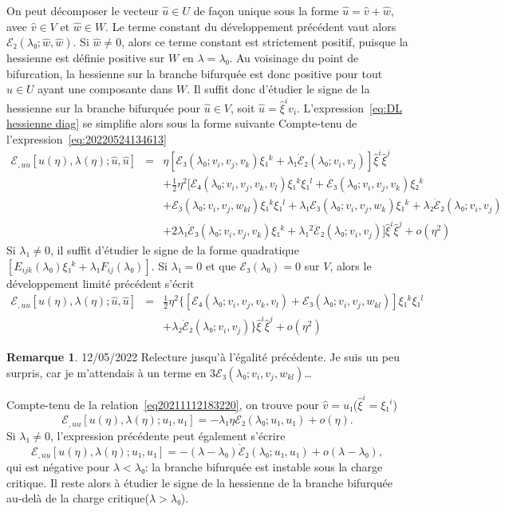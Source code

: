 \documentclass[12pt, final]{amsart}
\theoremstyle{definition}
\newtheorem{remark}{Remarque}
\begin{document}
On peut décomposer le vecteur \(\hat{u}∈U\) de fa{\c c}on unique sous la forme \(\hat{u} = \hat{v} + \hat{w}\), avec \(\hat{v}∈V\) et \(\hat{w}∈W\). Le terme constant du développement précédent vaut alors \(ℰ₂(λ₀ ; \hat{w}, \hat{w})\). Si \(\hat{w} \neq 0\), alors ce terme constant est strictement positif, puisque la hessienne est définie positive sur \(W\) en \(λ = λ₀\). Au voisinage du point de bifurcation, la hessienne sur la branche bifurquée est donc positive pour tout \(\hat{u}∈U\) ayant une composante dans \(W\). Il suffit donc d'étudier le signe de la hessienne sur la branche bifurquée pour \(\hat{u}∈V\), soit \(\hat{u} = \hat{ξ}^i v_i\). L'expression~\eqref{eq:DL hessienne diag} se simplifie alors sous la forme suivante Compte-tenu de l'expression~\eqref{eq:20220524134613}
\begin{eqnarray}
 ℰ_{, u u} [u(η), λ(η) ; \hat{u}, \hat{u}] &
 = & η [ℰ₃(λ₀ ; v_i, v_j, v_k) ξ₁^k + λ₁
 \dot{ℰ}₂(λ₀ ; v_i, v_j)] \hat{ξ}^i \hat{ξ}^j
 \nonumber\\
 & & + \tfrac{1}{2} η^2 [ℰ₄(λ₀ ; v_i, v_j, v_k, v_l)
 ξ₁^k ξ₁^l +ℰ₃(λ₀ ; v_i, v_j, v_k) ξ₂^k
  \nonumber\\
 & & +ℰ₃(λ₀ ; v_i, v_j, w_{k l}) ξ₁^k
 ξ₁^l + λ₁ ℰ₃(λ₀ ; v_i, v_j, w_k) ξ₁^k +
 λ₂ \dot{ℰ}₂(λ₀ ; v_i, v_j) \nonumber\\
 & & + 2 λ₁ \dot{ℰ}₃(λ₀ ; v_i, v_j,
 v_k) ξ₁^k + λ₁^2 \ddot{ℰ}₂(λ₀ ; v_i, v_j)]
 \hat{ξ}^i \hat{ξ}^j + o(η^2) \nonumber
\end{eqnarray}
Si \(λ₁ \neq 0\), il suffit d'étudier le signe de la forme
quadratique \([E_{i j k}(λ₀) ξ₁^k + λ₁ F_{i
 j}(λ₀)] .\) Si \(λ₁ = 0\) et que \(ℰ₃
(λ₀) = 0\) sur \(V\), alors le développement limité
précédent s'écrit
\begin{eqnarray}
 ℰ_{, u u} [u(η), λ(η) ; \hat{u}, \hat{u}] &
 = & \tfrac{1}{2} η^2 \{ [ℰ₄(λ₀ ; v_i, v_j, v_k, v_l)
  +ℰ₃(λ₀ ; v_i, v_j, w_{k l})] ξ₁^k
 ξ₁^l \nonumber\\
 & & + λ₂ \dot{ℰ}₂(λ₀ ; v_i, v_j) \}
 \hat{ξ}^i \hat{ξ}^j + o(η^2) \nonumber
\end{eqnarray}

\begin{remark}
 12/05/2022 Relecture jusqu'à l'égalité précédente. Je  suis un peu surpris, car je m'attendais à un terme en \(3ℰ₃(λ₀ ; v_i, v_j, w_{k l})\)\dots
\end{remark}

Compte-tenu de la relation~\eqref{eq20211112183220}, on trouve pour \(\hat{v} = u₁\)(\(\hat{ξ}^i = ξ₁^i\))
\begin{equation}
 ℰ_{, u u} [u(η), λ(η) ; u₁, u₁] = -
 λ₁ η \dot{ℰ}₂(λ₀ ; u₁, u₁) + o(η) .
\end{equation}
Si \(λ₁ \neq 0\), l'expression précédente peut également s'écrire
\begin{equation}
 ℰ_{, u u} [u(η), λ(η) ; u₁, u₁] = -
 (λ - λ₀) \dot{ℰ}₂(λ₀ ; u₁, u₁) + o
 (λ - λ₀),
\end{equation}
qui est négative pour \(λ < λ₀\): la branche bifurquée est instable sous la charge critique. Il reste alors à étudier le signe de la hessienne de la branche bifurquée au-delà de la charge critique(\(λ > λ₀\)).
\end{document}
